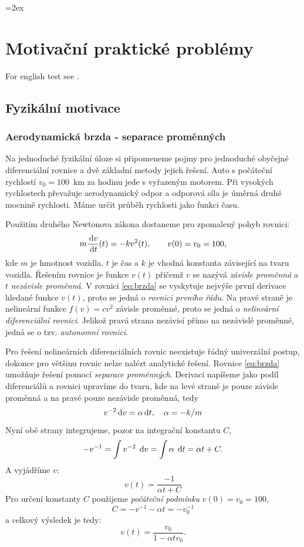 \documentclass[a4paper, 12pt]{book}
\theoremstyle{definition}
\def\d{\,{\rm d}}               %
\def\df#1{\emph{#1}}
\begin{document}
\parskip=2ex
\parindent=0pt

\tableofcontents


\chapter{Motivační praktické problémy}
For english test see \cite[Lecture 1]{flaherty}.

\section{Fyzikální motivace}
\subsection{Aerodynamická brzda - separace proměnných}
Na jednoduché fyzikální úloze si připomeneme pojmy pro jednoduché obyčejné diferenciální rovnice
a dvě základní metody jejich řešení.
Auto s počáteční rychlostí $v_0=100$~km za hodinu jede s vyřazeným motorem. Při vysokých 
rychlostech převažuje aerodynamický odpor a odporová síla je úměrná druhé mocnině rychlosti.
Máme určit průběh rychlosti jako funkci času. 

Použitím druhého Newtonova zákona dostaneme pro zpomalený pohyb rovnici:
\begin{equation}
  \label{eq:brzda}
  m\frac{\d v}{\d t}(t) = -k v^2(t),\qquad v(0)=v_0=100,
\end{equation}
kde $m$ je hmotnost vozidla, $t$ je čas a $k$ je vhodná konstanta závisející na tvaru vozidla.
Řešením rovnice je funkce $v(t)$ přičemž $v$ se nazývá \df{závisle proměnná} a $t$ \df{nezávisle proměnná}.
V rovnici \eqref{eq:brzda} se vyskytuje nejvýše první derivace hledané funkce $v(t)$, proto se jedná 
o \df{rovnici prvního řádu}. Na pravé straně je nelineární funkce $f(v)= cv^2$ závisle proměnné, proto se jedná o \df{nelineární diferenciální rovnici}.
Jelikož pravá strana nezávisí přímo na nezávislé proměnné, jedná se o tzv. \df{autonomní rovnici}.

Pro řešení nelineárních diferenciálních rovnic neexistuje řádný univerzální postup, do\-kon\-ce pro většinu rovnic nelze nalézt analytické řešení.
Rovnice \eqref{eq:brzda} umožňuje řešení pomocí \df{separace proměnných}. Derivaci napíšeme jako podíl diferenciálů a rovnici upravíme do tvaru, kde 
na levé straně je pouze závisle proměnná a na pravé pouze nezávisle proměnná, tedy
\[
    v^{-2} \d v =  \alpha \d t, \quad \alpha = -k/m 
\]
Nyní obě strany integrujeme, pozor na integrační konstantu $C$,
\[
    -v^{-1} = \int v^{-2}\; \d v = \int \alpha\; \d t =\alpha t + C.
\]    
A vyjádříme $v$:
\[
    v(t) = \frac{-1}{\alpha t + C}
\]
Pro určení konstanty $C$ použijeme \df{počáteční podmínku} $v(0) = v_0 = 100$,
\[
  C = -v^{-1} - \alpha t = -v_0^{-1}
\]
a celkový výsledek je tedy:
\[
  v(t) = \frac{v_0}{1-\alpha tv_0}.
\]
\end{document}

